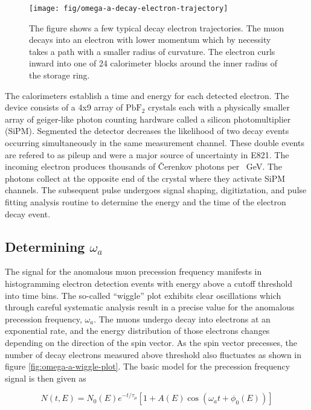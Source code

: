 \begin{figure}
\centering
\texttt{[image: fig/omega-a-decay-electron-trajectory]}
\caption{
    The figure shows a few typical decay electron trajectories.  The muon decays into an electron with lower momentum which by necessity takes a path with a smaller radius of curvature.  The electron curls inward into one of 24 calorimeter blocks around the inner radius of the storage ring. 
    \label{fig:omega-a-decay-electron-trajectory}
}
\end{figure}

The calorimeters establish a time and energy for each detected electron.  The device consists of a 4x9 array of $\mathrm{PbF_2}$ crystals each with a physically smaller array of geiger-like photon counting hardware called a silicon photomultiplier (SiPM).  Segmented the detector decreases the likelihood of two decay events occurring simultaneously in the same measurement channel.  These double events are refered to as pileup and were a major source of uncertainty in E821.  The incoming electron produces thousands of \v{C}erenkov photons per \SI{}{\GeV}.  The photons collect at the opposite end of the crystal where they activate SiPM channels.  The subsequent pulse undergoes signal shaping, digitiztation, and pulse fitting analysis routine to determine the energy and the time of the electron decay event.  

\subsection{Determining $\omega_a$}

The signal for the anomalous muon precession frequency manifests in histogramming electron detection events with energy above a cutoff threshold into time bins. The so-called ``wiggle'' plot exhibits clear oscillations which through careful systematic analysis result in a precise value for the anomalous precession frequency, $\omega_a$.  The muons undergo decay into electrons at an exponential rate, and the energy distribution of those electrons changes depending on the direction of the spin vector.  As the spin vector precesses, the number of decay electrons measured above threshold also fluctuates as shown in figure \ref{fig:omega-a-wiggle-plot}.  The basic model for the precession frequency signal is then given as 

\begin{equation}
\label{eqn:omega-a-signal}
N(t, E) = N_0(E) e^{-t/\tau_\mu} \left[ 1 + A(E) \cos(\omega_a t + \phi_0(E))\right]
\end{equation}


